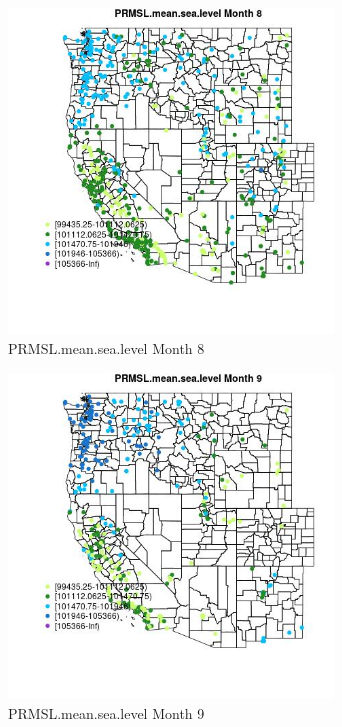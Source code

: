 \begin{figure} 
\centering  
\includegraphics[width=0.77\textwidth]{Code_Outputs/Report_ML_input_PM25_Step4_part_e_de_duplicated_aves_compiled_2019-05-18wNAs_MapObsMo8PRMSLmeansealevel.jpg} 
\caption{\label{fig:Report_ML_input_PM25_Step4_part_e_de_duplicated_aves_compiled_2019-05-18wNAsMapObsMo8PRMSLmeansealevel}PRMSL.mean.sea.level Month 8} 
\end{figure} 
 

\begin{figure} 
\centering  
\includegraphics[width=0.77\textwidth]{Code_Outputs/Report_ML_input_PM25_Step4_part_e_de_duplicated_aves_compiled_2019-05-18wNAs_MapObsMo9PRMSLmeansealevel.jpg} 
\caption{\label{fig:Report_ML_input_PM25_Step4_part_e_de_duplicated_aves_compiled_2019-05-18wNAsMapObsMo9PRMSLmeansealevel}PRMSL.mean.sea.level Month 9} 
\end{figure} 
 

